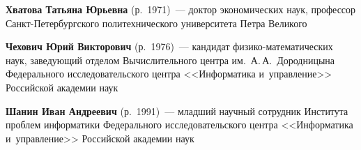 \begin{multicols}{2}
   \noindent
  \textbf{Хватова Татьяна Юрьевна} (р.\ 1971)~---
  доктор экономических наук, профессор Санкт-Пе\-тер\-бург\-ско\-го политехнического университета 
  Петра Великого
  

   \vspace*{3.5pt}
   
     \noindent
\textbf{Чехович Юрий Викторович} (р.\ 1976)~--- кандидат 
фи\-зи\-ко-ма\-те\-ма\-ти\-че\-ских наук, за\-ве\-ду\-ющий отделом Вычислительного 
цент\-ра им.\ А.\,А.~Дородницына Федерального исследовательского цент\-ра 
<<Информатика и~управ\-ле\-ние>> Российской академии наук

   \vspace*{3.5pt}
   
   \noindent
  \textbf{Шанин Иван Андреевич} (р.\ 1991)~--- младший научный сотрудник Института проб\-лем 
  информатики Федерального исследовательского цент\-ра <<Информатика и~управ\-ле\-ние>> 
  Российской академии \mbox{наук}
  {
  
  }
  
  
     
  
   





\def\leftkol{ОБ АВТОРАХ}

\def\rightkol{ОБ АВТОРАХ}


 \label{end\stat}



\end{multicols}

\def\leftkol{ОБ АВТОРАХ}
\def\rightkol{ОБ АВТОРАХ}

\newpage